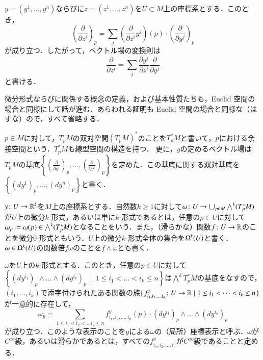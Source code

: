 \begin{prop}
$y=(y^1, \dots, y^n)$ならびに$z = (z^1,\dots, z^n)$を$U \subset M$上の座標系とする．このとき，
\begin{equation}
\left( \frac{\partial}{\partial z^i} \right)_p = \sum_{j} \left( \frac{\partial }{\partial z^i} y^j \right) (p) \cdot \left( \frac{\partial}{\partial y^j} \right)_p
\end{equation}が成り立つ．したがって，ベクトル場の変換則は
\begin{equation}
\frac{\partial}{\partial z^i} = \sum_{j} \frac{\partial y^j}{\partial z^i} \frac{\partial}{\partial y^j}
\end{equation}と書ける．
\end{prop}

微分形式ならびに関係する概念の定義，および基本性質たちも，Euclid 空間の場合と同様にして話が進む．あらわれる証明も Euclid 空間の場合と同様な（はずな）ので，すべて省略する．

\begin{defi}
$p \in M$に対して，$T_pM$の双対空間$(T_pM)^*$のことを$T_p^*M$と書いて，$p$における余接空間という．$T_p^*M$も線型空間の構造を持つ．
更に，$y$の定めるベクトル場は$T_pM$の基底$\left\{ \left(\frac{\partial}{\partial y^i}\right)_p,\dots, \left(\frac{\partial}{\partial y^i}\right)_p \right\}$を定めた．この基底に関する双対基底を$\left\{ (dy^1)_p,\dots, \left(dy^n\right)_p \right\}$と書く．
\end{defi}

\begin{defi}
$y \colon U \to \mathbb{R}^k$を$M$上の座標系とする．自然数$k \geq 1$に対して$\omega \colon U \to \bigcup_{p \in M} \bigwedge^k(T_p^*M)$が$U$上の微分$k$-形式，あるいは単に$k$-形式であるとは，任意の$p \in U$に対して$\omega_p \coloneqq \omega(p) \in \bigwedge^k(T_p^*M)$となることをいう．また，（滑らかな）関数$f \colon U \to \mathbb{R}$のことを微分0-形式ともいう．$U$上の微分$k$-形式全体の集合を$\Omega^k(U)$と書く．$\omega \in \Omega^k(U)$の関数倍$f\omega$のことを$f \wedge \omega$とも書く．
\end{defi}

\begin{defi}
$\omega$を$U$上の$k$-形式とする．このとき，任意の$p \in U$に対して$\left\{ \left( dy^{i_1} \right)_p \wedge \dots \wedge \left( dy^{i_k} \right)_p \ \mid \ 1 \leq i_1 < \dots < i_k \leq n \right\}$は$\bigwedge^k T^*_pM$の基底をなすので，$(i_1, \dots, i_k)$で添字付けられたある関数の族$\set{ f^y_{i_1,i_2,\dots,i_n} \colon U \to \mathbb{R}| 1 \leq i_1 < \dots < i_k \leq n }$が一意的に存在して，
\begin{equation}
\omega_p = \sum_{1 \leq i_1 < i_2 < \dots i_k \leq n} {f^y_{i_1,i_2,\dots,i_n}}(p) \cdot \left( dy^{i_1} \right)_p \wedge \dots \wedge \left( dy^{i_k} \right)_p
\end{equation}が成り立つ．このような表示のことを$y$による$\omega$の（局所）座標表示と呼ぶ．$\omega$が$C^\infty$級，あるいは滑らかであるとは，すべての$f^y_{i_1,i_2,\dots,i_n}$が$C^\infty$級であることと定める．
\end{defi}

